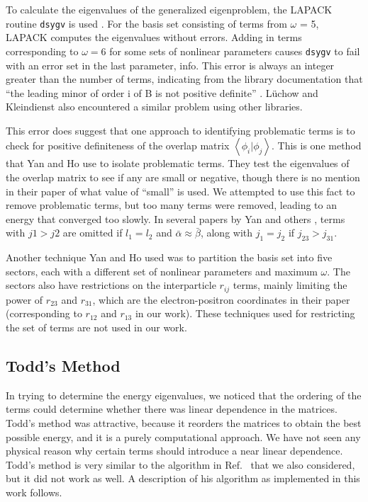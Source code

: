 \documentclass[Dissertation.tex]{subfiles}
\begin{document}
To calculate the eigenvalues of the generalized eigenproblem, the LAPACK 
routine \texttt{dsygv} is used \cite{dsygv}. For the basis set consisting of 
terms from $\omega$ = 5, LAPACK computes the eigenvalues without errors. 
Adding in terms corresponding to $\omega = 6$ for some sets of nonlinear 
parameters causes \texttt{dsygv} to fail with an error set in the last 
parameter, info. This error is always an integer greater than the number of 
terms, indicating from the library documentation that ``the leading minor of 
order i of B is not positive definite'' \cite{dsygv}. L\"uchow and 
Kleindienst \cite{Luchow1993} also encountered a similar problem using
other libraries.

This error does suggest that one approach to identifying problematic terms is 
to check for positive definiteness of the overlap matrix
$\left\langle \phi_i | \phi_j \right\rangle$. This is one method that
Yan and Ho \cite{Yan1999} use to isolate 
problematic terms. They test the eigenvalues of the overlap 
matrix to see if any are small or negative, though there is no mention in 
their paper of what value of ``small'' is used. We attempted to use this fact 
to remove problematic terms, but too many terms were removed, leading to an 
energy that converged too slowly. In several papers by Yan and others
\cite{Yan1998,Yan1998a,Yan1999,Drake1995,Yan1997a}, terms with $j1 > j2$ are 
omitted if $l_1 = l_2$ and $\bar{\alpha} \approx \bar{\beta}$, along with $j_1 = j_2$ if
$j_{23} > j_{31}$. %

Another technique Yan and Ho \cite{Yan1999} used was to partition the basis set into five 
sectors, each with a different set of nonlinear parameters and maximum
$\omega$. The sectors also have restrictions on the interparticle
$r_{ij}$ terms, mainly limiting the power of $r_{23}$ and $r_{31}$, which are the 
electron-positron coordinates in their paper (corresponding to $r_{12}$ and
$r_{13}$ in our work). These techniques used for restricting 
the set of terms are not used in our work.


\subsection{Todd's Method}
\label{sec:ToddBound}

In trying to determine the energy eigenvalues, we noticed that the ordering 
of the terms could determine whether there was linear dependence in the 
matrices. Todd's method \cite{Todd2007,Armour2008} was attractive,
because it reorders the matrices to obtain the best possible energy, and it 
is a purely computational approach. We have not seen 
any physical reason why certain terms should introduce a near linear 
dependence. Todd's method is very similar to the algorithm in
Ref.~\cite{Luchow1992}
that we also considered, but it did not work as well. A description of his
algorithm as implemented in this work follows.
\end{document}
